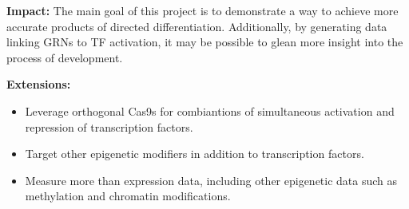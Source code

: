 \documentclass[10pt]{article}
\begin{document}
\textbf{Impact:} The main goal of this project is to demonstrate a way to achieve more accurate products of directed differentiation. Additionally, by generating data linking GRNs to TF activation, it may be possible to glean more insight into the process of development.
\newline

\textbf{Extensions:}

\begin{itemize}

\item Leverage orthogonal Cas9s for combiantions of simultaneous activation and repression of transcription factors.

\item Target other epigenetic modifiers in addition to transcription factors.

\item Measure more than expression data, including other epigenetic data such as methylation and chromatin modifications.

\end{itemize}

\pagebreak



\end{document}
